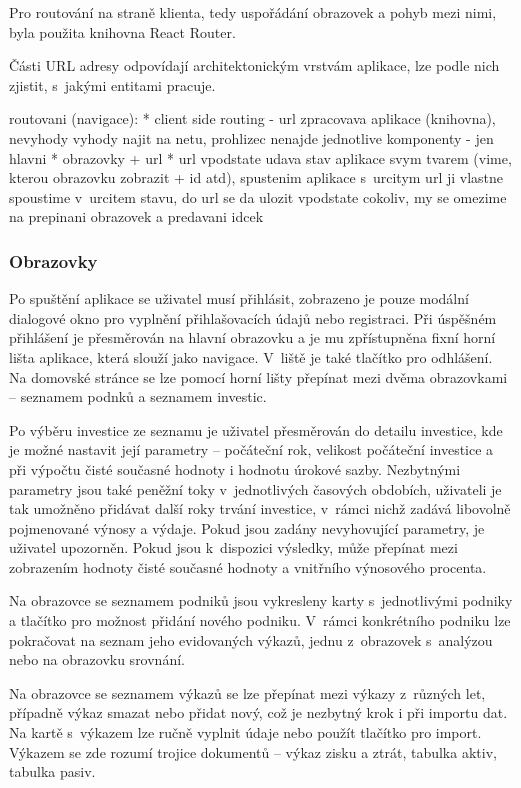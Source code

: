 Pro routování na straně klienta, tedy uspořádání obrazovek a pohyb mezi nimi, byla použita knihovna React Router.

Části URL adresy odpovídají architektonickým vrstvám aplikace, lze podle nich zjistit, s~jakými entitami pracuje.

routovani (navigace):
* client side routing - url zpracovava aplikace (knihovna), nevyhody vyhody najit na netu, prohlizec nenajde jednotlive komponenty - jen hlavni
* obrazovky + url
* url vpodstate udava stav aplikace svym tvarem (vime, kterou obrazovku zobrazit + id atd), spustenim aplikace s~urcitym url ji vlastne spoustime v~urcitem stavu, do url se da ulozit vpodstate cokoliv, my se omezime na prepinani obrazovek a predavani idcek

\subsubsection{Obrazovky}

Po spuštění aplikace se uživatel musí přihlásit, zobrazeno je pouze modální dialogové okno pro vyplnění přihlašovacích údajů nebo registraci. Při úspěšném přihlášení je přesměrován na hlavní obrazovku a je mu zpřístupněna fixní horní lišta aplikace, která slouží jako navigace. V~liště je také tlačítko pro odhlášení. Na domovské stránce se lze pomocí horní lišty přepínat mezi dvěma obrazovkami -- seznamem podnků a seznamem investic.

Po výběru investice ze seznamu je uživatel přesměrován do detailu investice, kde je možné nastavit její parametry -- počáteční rok, velikost počáteční investice a při výpočtu čisté současné hodnoty i hodnotu úrokové sazby. Nezbytnými parametry jsou také peněžní toky v~jednotlivých časových obdobích, uživateli je tak umožněno přidávat další roky trvání investice, v~rámci nichž zadává libovolně pojmenované výnosy a výdaje. Pokud jsou zadány nevyhovující parametry, je uživatel upozorněn. Pokud jsou k~dispozici výsledky, může přepínat mezi zobrazením hodnoty čisté současné hodnoty a vnitřního výnosového procenta.

Na obrazovce se seznamem podniků jsou vykresleny karty s~jednotlivými podniky a tlačítko pro možnost přidání nového podniku. V~rámci konkrétního podniku lze pokračovat na seznam jeho evidovaných výkazů, jednu z~obrazovek s~analýzou nebo na obrazovku srovnání. 

Na obrazovce se seznamem výkazů se lze přepínat mezi výkazy z~různých let, případně výkaz smazat nebo přidat nový, což je nezbytný krok i při importu dat. Na kartě s~výkazem lze ručně vyplnit údaje nebo použít tlačítko pro import. Výkazem se zde rozumí trojice dokumentů -- výkaz zisku a ztrát, tabulka aktiv, tabulka pasiv.


